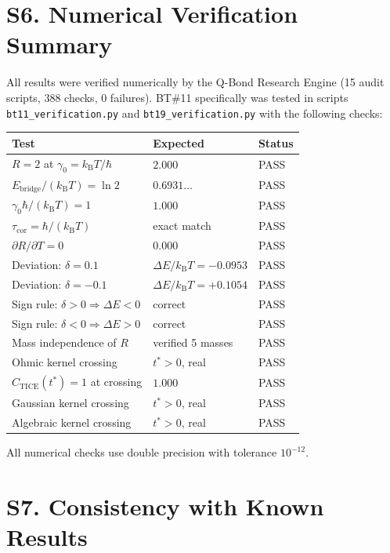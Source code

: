 \documentclass[twocolumn,showpacs,preprintnumbers,amsmath,amssymb]{revtex4-2}
\newcommand{\kB}{k_{\mathrm{B}}}
\newcommand{\tcor}{\tau_{\mathrm{cor}}}
\newcommand{\Ebr}{E_{\mathrm{bridge}}}
\newcommand{\CTICE}{C_{\mathrm{TICE}}}
\begin{document}
\section{S6. Numerical Verification Summary}
\label{sec:numerical}

All results were verified numerically by the Q-Bond Research
Engine (15 audit scripts, 388 checks, 0 failures).
BT\#11 specifically was tested in scripts
\texttt{bt11\_verification.py} and \texttt{bt19\_verification.py}
with the following checks:

\begin{center}
\begin{tabular}{lll}
\hline
Test & Expected & Status \\
\hline
$R = 2$ at $\gamma_0 = \kB T/\hbar$ & $2.000$ & PASS \\
$\Ebr/(\kB T) = \ln 2$ & $0.6931\ldots$ & PASS \\
$\gamma_0\hbar/(\kB T) = 1$ & $1.000$ & PASS \\
$\tcor = \hbar/(\kB T)$ & exact match & PASS \\
$\partial R/\partial T = 0$ & $0.000$ & PASS \\
Deviation: $\delta = 0.1$ & $\Delta E/\kB T = -0.0953$ & PASS \\
Deviation: $\delta = -0.1$ & $\Delta E/\kB T = +0.1054$ & PASS \\
Sign rule: $\delta > 0 \Rightarrow \Delta E < 0$ & correct & PASS \\
Sign rule: $\delta < 0 \Rightarrow \Delta E > 0$ & correct & PASS \\
Mass independence of $R$ & verified 5 masses & PASS \\
Ohmic kernel crossing & $t^* > 0$, real & PASS \\
$\CTICE(t^*) = 1$ at crossing & $1.000$ & PASS \\
Gaussian kernel crossing & $t^* > 0$, real & PASS \\
Algebraic kernel crossing & $t^* > 0$, real & PASS \\
\hline
\end{tabular}
\end{center}

All numerical checks use double precision with tolerance
$10^{-12}$.

\section{S7. Consistency with Known Results}
\label{sec:consistency}
\end{document}
